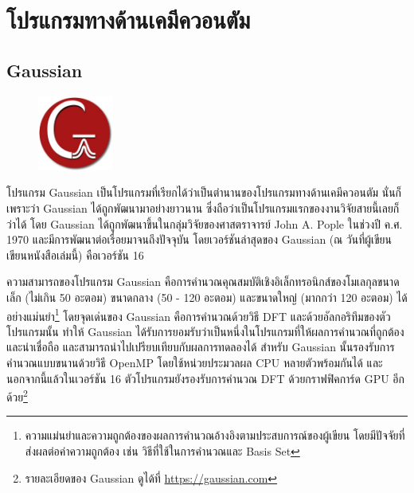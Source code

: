 

\chapter{โปรแกรมทางด้านเคมีควอนตัม}
\label{ch:qm_software}

\section{Gaussian}
\label{sec:software_gaussian}

\begin{figure}
    \centering
    \includegraphics[width=0.22\textwidth]{fig/logo_gaussian.jpg}
    \label{fig:logo_gaussian}
\end{figure}

โปรแกรม Gaussian เป็นโปรแกรมที่เรียกได้ว่าเป็นตำนานของโปรแกรมทางด้านเคมีควอนตัม นั่นก็เพราะว่า Gaussian ได้ถูกพัฒนามาอย่างยาวนาน ซึ่งถือว่าเป็นโปรแกรมแรกของงานวิจัยสายนี้เลยก็ว่าได้ โดย Gaussian ได้ถูกพัฒนาขึ้นในกลุ่มวิจัยของศาสตราจารย์ John A. Pople ในช่วงปี ค.ศ. 1970 และมีการพัฒนาต่อเรื่อยมาจนถึงปัจจุบัน โดยเวอร์ชันล่าสุดของ Gaussian (ณ วันที่ผู้เขียนเขียนหนังสือเล่มนี้) คือเวอร์ชัน 16\autocite{g16}

ความสามารถของโปรแกรม Gaussian คือการคำนวณคุณสมบัติเชิงอิเล็กทรอนิกส์ของโมเลกุลขนาดเล็ก (ไม่เกิน 50 อะตอม) ขนาดกลาง (50 - 120 อะตอม) และขนาดใหญ่ (มากกว่า 120 อะตอม) ได้อย่างแม่นยำ\footnote{ความแม่นยำและความถูกต้องของผลการคำนวณอ้างอิงตามประสบการณ์ของผู้เขียน โดยมีปัจจัยที่ส่งผลต่อค่าความถูกต้อง เช่น วิธีที่ใช้ในการคำนวณและ Basis Set} โดยจุดเด่นของ Gaussian คือการคำนวณด้วยวิธี DFT และด้วยอัลกอริทึมของตัวโปรแกรมนั้น ทำให้ Gaussian ได้รับการยอมรับว่าเป็นหนึ่งในโปรแกรมที่ให้ผลการคำนวณที่ถูกต้องและน่าเชื่อถือ และสามารถนำไปเปรียบเทียบกับผลการทดลองได้ สำหรับ Gaussian นั้นรองรับการคำนวณแบบขนานด้วยวิธี OpenMP โดยใช้หน่วยประมวลผล CPU หลายตัวพร้อมกันได้ และนอกจากนี้แล้วในเวอร์ชัน 16 ตัวโปรแกรมยังรองรับการคำนวณ DFT ด้วยกราฟฟิคการ์ด GPU อีกด้วย\footnote{รายละเอียดของ Gaussian ดูได้ที่ \url{https://gaussian.com}}

